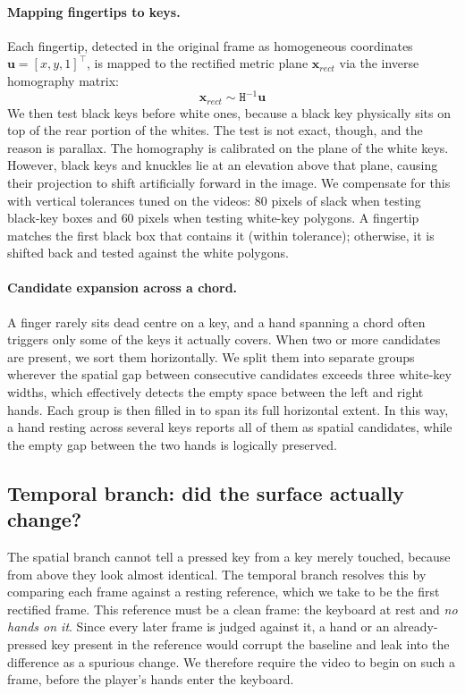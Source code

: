 \documentclass[11pt]{article}
\begin{document}
\paragraph{Mapping fingertips to keys.}
Each fingertip, detected in the original frame as homogeneous coordinates $\mathbf{u} = [x, y, 1]^\top$, 
is mapped to the rectified metric plane $\mathbf{x}_{rect}$ via the inverse homography matrix:
\begin{equation}
    \mathbf{x}_{rect} \sim \mathtt{H}^{-1} \mathbf{u}
\end{equation}
We then test black keys before white ones, because a black key physically sits on top 
of the rear portion of the whites. The test is not exact, though, and the reason is 
parallax. The homography is calibrated on the plane of the white keys. However, black 
keys and knuckles lie at an elevation above that plane, causing their projection to 
shift artificially forward in the image. We compensate for this with vertical 
tolerances tuned on the videos: $80$ pixels of slack when testing black-key boxes 
and $60$ pixels when testing white-key polygons. A fingertip matches the first black 
box that contains it (within tolerance); otherwise, it is shifted back and tested 
against the white polygons.

\paragraph{Candidate expansion across a chord.}
A finger rarely sits dead centre on a key, and a hand spanning a chord often
triggers only some of the keys it actually covers. When two or more candidates
are present, we sort them horizontally. We split them into separate groups wherever 
the spatial gap between consecutive candidates exceeds three white-key widths, 
which effectively detects the empty space between the left and right hands. 
Each group is then filled in to span its full horizontal extent. In this way, a hand 
resting across several keys reports all of them as spatial candidates, while the 
empty gap between the two hands is logically preserved.

\subsection{Temporal branch: did the surface actually change?}
\label{sec:temporal}
The spatial branch cannot tell a pressed key from a key merely touched, because
from above they look almost identical. The temporal branch resolves this by
comparing each frame against a resting reference, which we take to be the first
rectified frame. This reference must be a clean frame: the keyboard at rest and
\emph{no hands on it}. Since every later frame is judged against it, a hand or an
already-pressed key present in the reference would corrupt the baseline and leak
into the difference as a spurious change. We therefore require the video to begin
on such a frame, before the player's hands enter the keyboard.
\end{document}

